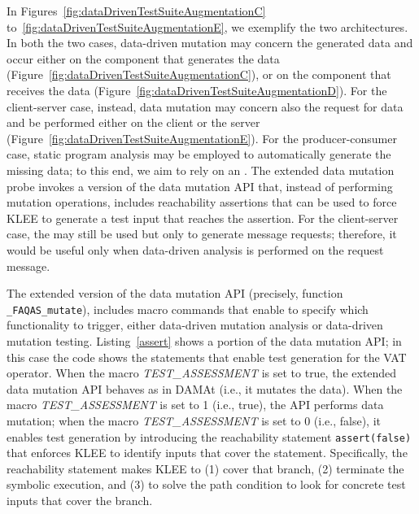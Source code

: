 In Figures~\ref{fig:dataDrivenTestSuiteAugmentationC} to~\ref{fig:dataDrivenTestSuiteAugmentationE}, we exemplify the two architectures. In both the two cases, data-driven mutation may concern the generated data and occur either on the component that generates the data (Figure~\ref{fig:dataDrivenTestSuiteAugmentationC}), or on the component that receives the data (Figure~\ref{fig:dataDrivenTestSuiteAugmentationD}).
For the client-server case, instead, data mutation may concern also the request for data and be performed either on the client or the server (Figure~\ref{fig:dataDrivenTestSuiteAugmentationE}). For the producer-consumer case, static program analysis may be employed to automatically generate the missing data; to this end, we aim to rely on an .
The extended data mutation probe invokes a version of the data mutation API that, instead of performing mutation operations, includes reachability assertions that can be used to force KLEE to generate a test input that reaches the assertion.
For the client-server case, the  may still be used but only to generate message requests; therefore, it would be useful only when data-driven analysis is performed on the  request message.

The extended version of the data mutation API (precisely, function \texttt{\_FAQAS\_mutate}),
includes macro commands that enable to specify which functionality to trigger, either data-driven mutation analysis or data-driven mutation testing.
Listing~\ref{assert} shows a portion of the data mutation API; in this case the code shows the statements that enable test generation for the VAT operator. When the macro \emph{TEST\_ASSESSMENT} is set to true, the extended data mutation API behaves as in DAMAt (i.e., it mutates the data). When the macro \emph{TEST\_ASSESSMENT} is set to 1 (i.e., true), the API performs data mutation;
when the macro \emph{TEST\_ASSESSMENT} is set to 0 (i.e., false),
it enables test generation by introducing the reachability statement \texttt{assert(false)} that enforces KLEE to identify inputs that cover the statement.
Specifically, the reachability statement makes KLEE to (1) cover that branch, (2)  terminate the symbolic execution, and (3) to solve the path condition to look for concrete test inputs that cover the branch.


